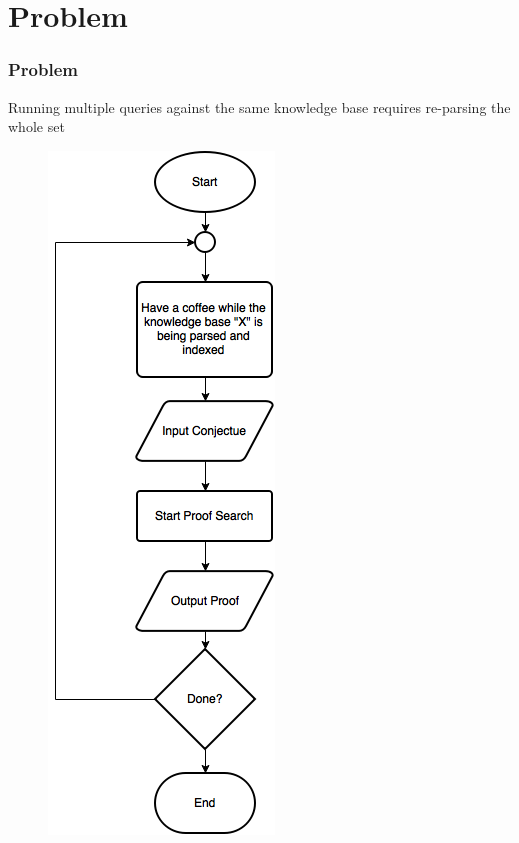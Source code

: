 \documentclass[10pt]{beamer}
\begin{document}
\section{Problem}
\begin{frame}[fragile]
  \frametitle{Problem}
  Running multiple queries against the same knowledge base requires re-parsing the whole set
\begin{figure} \includegraphics[width=\linewidth,height=0.8\textheight,keepaspectratio]{imgs/OldDeductionFC.png} \end{figure}
\end{frame}
\end{document}
